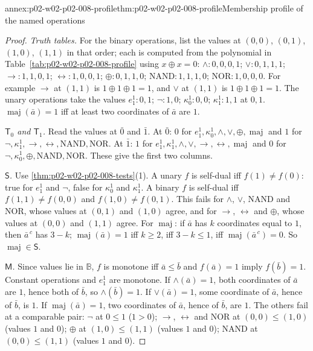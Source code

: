 \begin{annexitem}{annex:p02-w02-p02-008-profile}{thm:p02-w02-p02-008-profile}{Membership profile of the named operations}
\begin{proof}
\emph{Truth tables.}  For the binary operations, list the values at
\((0,0)\), \((0,1)\), \((1,0)\), \((1,1)\) in that order; each is computed from the
polynomial in Table~\ref{tab:p02-w02-p02-008-profile} using \(x\oplus x=0\):
\(\land\colon0,0,0,1\); \(\lor\colon0,1,1,1\); \(\to\colon1,1,0,1\);
\(\leftrightarrow\colon1,0,0,1\); \(\oplus\colon0,1,1,0\);
\(\mathrm{NAND}\colon1,1,1,0\); \(\mathrm{NOR}\colon1,0,0,0\).  For example
\(\to\) at \((1,1)\) is \(1\oplus1\oplus1=1\), and \(\lor\) at \((1,1)\) is
\(1\oplus1\oplus1=1\).  The unary operations take the values \(e^1_1\colon
0,1\); \(\neg\colon1,0\); \(\kappa^1_0\colon0,0\); \(\kappa^1_1\colon1,1\)
at \(0,1\).  \(\operatorname{maj}(\bar a)=1\) iff at least two coordinates of
\(\bar a\) are \(1\).

\emph{\(\mathsf T_0\) and \(\mathsf T_1\).}  Read the values at \(\bar0\) and
\(\bar1\).  At \(\bar0\): \(0\) for \(e^1_1,\kappa^1_0,\land,\lor,\oplus,
\operatorname{maj}\) and \(1\) for \(\neg,\kappa^1_1,\to,\leftrightarrow,
\mathrm{NAND},\mathrm{NOR}\).  At \(\bar1\): \(1\) for \(e^1_1,\kappa^1_1,
\land,\lor,\to,\leftrightarrow,\operatorname{maj}\) and \(0\) for
\(\neg,\kappa^1_0,\oplus,\mathrm{NAND},\mathrm{NOR}\).  These give the first
two columns.

\emph{\(\mathsf S\).}  Use \cref{thm:p02-w02-p02-008-tests}(1).  A unary \(f\)
is self-dual iff \(f(1)\neq f(0)\): true for \(e^1_1\) and \(\neg\), false
for \(\kappa^1_0\) and \(\kappa^1_1\).  A binary \(f\) is self-dual iff
\(f(1,1)\neq f(0,0)\) and \(f(1,0)\neq f(0,1)\).  This fails for \(\land\),
\(\lor\), \(\mathrm{NAND}\) and \(\mathrm{NOR}\), whose values at \((0,1)\)
and \((1,0)\) agree, and for \(\to\), \(\leftrightarrow\) and \(\oplus\),
whose values at \((0,0)\) and \((1,1)\) agree.  For \(\operatorname{maj}\):
if \(\bar a\) has \(k\) coordinates equal to \(1\), then \(\bar a^{\,c}\)
has \(3-k\); \(\operatorname{maj}(\bar a)=1\) iff \(k\geq2\), iff
\(3-k\leq1\), iff \(\operatorname{maj}(\bar a^{\,c})=0\).  So
\(\operatorname{maj}\in\mathsf S\).

\emph{\(\mathsf M\).}  Since values lie in \(\mathbb B\), \(f\) is monotone
iff \(\bar a\leq\bar b\) and \(f(\bar a)=1\) imply \(f(\bar b)=1\).  Constant
operations and \(e^1_1\) are monotone.  If \(\land(\bar a)=1\), both
coordinates of \(\bar a\) are \(1\), hence both of \(\bar b\), so
\(\land(\bar b)=1\).  If \(\lor(\bar a)=1\), some coordinate of \(\bar a\),
hence of \(\bar b\), is \(1\).  If \(\operatorname{maj}(\bar a)=1\), two
coordinates of \(\bar a\), hence of \(\bar b\), are \(1\).  The others fail
at a comparable pair: \(\neg\) at \(0\leq1\) (\(1>0\)); \(\to\),
\(\leftrightarrow\) and \(\mathrm{NOR}\) at \((0,0)\leq(1,0)\) (values
\(1\) and \(0\)); \(\oplus\) at \((1,0)\leq(1,1)\) (values \(1\) and \(0\));
\(\mathrm{NAND}\) at \((0,0)\leq(1,1)\) (values \(1\) and \(0\)).


\end{proof}
\end{annexitem}
